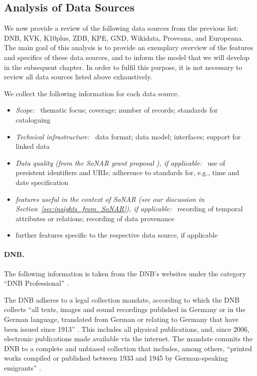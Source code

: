 \subsection{Analysis of Data Sources}

We now provide a review of the following data sources from the previous list:
\gls{DNB}, \gls{KVK}, \gls{K10plus}, \gls{ZDB}, \gls{KPE}, \gls{GND}, Wikidata, Proveana, and Europeana.
The main goal of this analysis is to provide an exemplary overview of the features and specifics
of these data sources, and to inform the model that we will develop in the subsequent chapter.
In order to fulfil this purpose, it is not necessary to review all data sources listed above
exhaustively.

We collect the following information for each data source.
%
\begin{itemize}
  \item
    \emph{Scope:}~
    thematic focus; coverage; number of records; standards for cataloguing
  \item
    \emph{Technical infrastructure:}~
    data format; data model; interfaces; support for linked data
  \item
    \emph{Data quality (from the \gls{SoNAR} grant proposal \autocite[p.\,19ff.]{SchneiderKempf2018}),
    if applicable:}~
    use of persistent identifiers and URIs; adherence to standards for, e.g., time and date specification
  \item
    \emph{features useful in the context of \gls{SoNAR} (see our discussion in Section~\ref{sec:insights_from_SoNAR}), if applicable:}~
    recording of temporal attributes or relations; recording of data provenance
  \item
    further features specific to the respective data source, if applicable
\end{itemize}

\paragraph{DNB.}

The following information is taken from the \gls{DNB}'s websites under the category \enquote{DNB Professional} \autocite{DNB_coll_mand,DNB_cataloguing,DNB_metadata}.

The DNB adheres to a legal collection mandate, according to which
the DNB collects \enquote{all texts, images and sound recordings published in Germany or in the German language, translated from German or relating to Germany that have been issued since 1913}  \autocite{DNB_coll_mand}. This includes all physical publications, and, since 2006, electronic publications made available via the internet. The mandate commits the DNB to a complete and unbiased collection that includes, among others, \enquote{printed works compiled or published between 1933 and 1945 by German-speaking emigrants} \autocite{DNB_coll_mand}.

